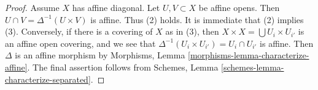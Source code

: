 \documentclass[10pt,a4paper]{amsart}
\theoremstyle{plain}
\theoremstyle{definition}
\theoremstyle{remark}
\numberwithin{equation}{subsection}
\begin{document}
\begin{proof}
Assume $X$ has affine diagonal. Let $U, V \subset X$ be affine opens.
Then $U \cap V = \Delta^{-1}(U \times V)$ is affine. Thus (2) holds.
It is immediate that (2) implies (3). Conversely, if there is a
covering of $X$ as in (3), then $X \times X = \bigcup U_i \times U_{i'}$
is an affine open covering, and we see that
$\Delta^{-1}(U_i \times U_{i'}) = U_i \cap U_{i'}$
is affine. Then $\Delta$ is an affine morphism by
Morphisms, Lemma \ref{morphisms-lemma-characterize-affine}.
The final assertion follows from Schemes, Lemma
\ref{schemes-lemma-characterize-separated}.
\end{proof}
\end{document}
